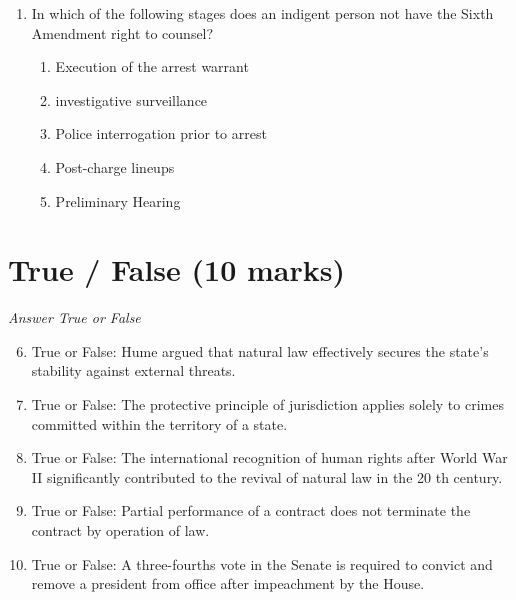 \documentclass[12pt]{article}
\begin{document}
\begin{enumerate}[label=\arabic*.]
\begin{enumerate}[label=(\alph*)]
    \item Because the concept of punishment has evolved over time.
    \item Because punishment can be justified in multiple ways.
    \item Because any definition of punishment should be value-neutral.
    \item Because the practice of punishment is separate from its justification.
    \item Because the justification of punishment varies across cultures.
\end{enumerate}
\item In which of the following stages does an indigent person not have the Sixth Amendment right to counsel?
\begin{enumerate}[label=(\alph*)]
    \item Execution of the arrest warrant
    \item investigative surveillance
    \item Police interrogation prior to arrest
    \item Post-charge lineups
    \item Preliminary Hearing
\end{enumerate}
\end{enumerate}

\section*{True / False (10 marks)}
\textit{Answer True or False}
\begin{enumerate}[label=\arabic*.]
\setcounter{enumi}{5}
\item True or False: Hume argued that natural law effectively secures the state's stability against external threats.
\item True or False: The protective principle of jurisdiction applies solely to crimes committed within the territory of a state.
\item True or False: The international recognition of human rights after World War II significantly contributed to the revival of natural law in the 20 th century.
\item True or False: Partial performance of a contract does not terminate the contract by operation of law.
\item True or False: A three-fourths vote in the Senate is required to convict and remove a president from office after impeachment by the House.
\end{enumerate}
\end{document}
